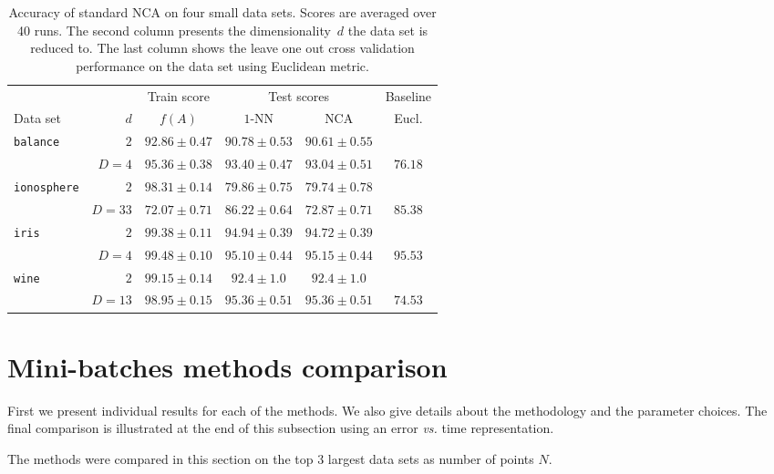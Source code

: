 \begin{table}
  \centering\begin{tabular}{lrcccc}
  \toprule
	  &     & Train score  & \multicolumn{2}{c}{Test scores} & Baseline \\
  \cmidrule(r){3-3} \cmidrule(r){4-5} \cmidrule(r){6-6}
  Data set & $d$ & $f(A)$ & $1$-NN & NCA & Eucl. \\
  \midrule
    \texttt{balance}&$2$&$92.86 \pm 0.47$&$90.78 \pm 0.53$&$90.61 \pm 0.55$&\\ 
		    &$D=4$&$95.36 \pm 0.38$&$93.40 \pm 0.47$&$93.04 \pm 0.51$&$76.18$\\ 
    \midrule
    \texttt{ionosphere}&$2$&$98.31 \pm 0.14$&$79.86 \pm 0.75$&$79.74 \pm 0.78$&\\ 
		       &$D=33$&$72.07 \pm 0.71$&$86.22 \pm 0.64$&$72.87 \pm 0.71$&$85.38$\\ 
    \midrule
    \texttt{iris}&$2$&$99.38 \pm 0.11$&$94.94 \pm 0.39$&$94.72 \pm 0.39$&\\ 
		 &$D=4$&$99.48 \pm 0.10$&$95.10 \pm 0.44$&$95.15 \pm 0.44$&$95.53$\\
    \midrule
    \texttt{wine}&$2$&$99.15 \pm 0.14$&$92.4 \pm 1.0$&$92.4 \pm 1.0$&\\ 
		 &$D=13$&$98.95 \pm 0.15$&$95.36 \pm 0.51$&$95.36 \pm 0.51$&$74.53$\\ 
  \bottomrule
  \end{tabular}
  \caption{\small Accuracy of standard NCA on four small data sets. Scores are averaged over 40 runs. The second column presents the dimensionality~$d$ the data set is reduced to. The last column shows the leave one out cross validation performance on the data set using Euclidean metric.}
  \label{table:eval-baseline}
\end{table}

\section{Mini-batches methods comparison}
\label{sec:method-comparison}

First we present individual results for each of the methods. We also give details about the methodology and the parameter choices. The final comparison is illustrated at the end of this subsection using an error \textit{vs.} time representation.

The methods were compared in this section on the top 3 largest data sets as number of points $N$.

